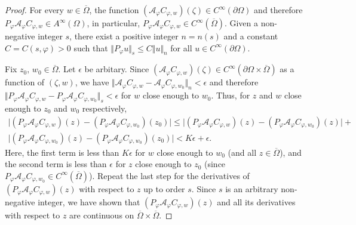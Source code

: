 \documentclass[11pt, reqno]{amsart}
\numberwithin{equation}{section}
\begin{document}
\begin{proof}
\medskip

For every $w\in\overline{\Omega}$, the function $(\mathcal{A}_{\varphi}C_{\varphi,w})(\zeta)\in C^{\infty}(\partial\Omega)$ and therefore $P_{\varphi}\mathcal{A}_{\varphi}C_{\varphi,w}\in A^{\infty}(\Omega)$, in particular, $P_{\varphi}\mathcal{A}_{\varphi}C_{\varphi,w}\in C^{\infty}(\overline{\Omega})$. Given a non-negative integer $s$, there exist a positive integer $n=n(s)$ and a constant $C=C(s,\varphi)>0$ such that $\Vert P_{\varphi}u\Vert_s\leq C \Vert u\Vert_n$ for all $u\in C^{\infty}(\partial\Omega)$.

\medskip

Fix $z_0,\,w_0\in\overline{\Omega}$. Let $\epsilon$ be arbitary. Since $(\mathcal{A}_{\varphi}C_{\varphi,w})(\zeta)\in C^{\infty}(\partial\Omega\times\overline{\Omega})$ as a function of $(\zeta,w)$, we have $\Vert \mathcal{A}_{\varphi}C_{\varphi,w}-\mathcal{A}_{\varphi}C_{\varphi,w_0}\Vert_n<\epsilon$ and therefore $\Vert P_{\varphi}\mathcal{A}_{\varphi}C_{\varphi,w}-P_{\varphi}\mathcal{A}_{\varphi}C_{\varphi,w_0}\Vert_s<\epsilon$ for $w$ close enough to $w_0$. Thus, for $z$ and $w$ close enough to $z_0$ and $w_0$ respectively,
\begin{multline*}
\vert (P_{\varphi}\mathcal{A}_{\varphi} C_{\varphi,w})(z)-(P_{\varphi}\mathcal{A}_{\varphi} C_{\varphi,w_0})(z_0)\vert 
\leq 
\vert (P_{\varphi}\mathcal{A}_{\varphi} C_{\varphi,w})(z) - (P_{\varphi}\mathcal{A}_{\varphi} C_{\varphi,w_0})(z)\vert
+\\
\vert (P_{\varphi}\mathcal{A}_{\varphi} C_{\varphi,w_0})(z)-(P_{\varphi}\mathcal{A}_{\varphi} C_{\varphi,w_0})(z_0)\vert
<
K\epsilon+\epsilon.
\end{multline*}
Here, the first term is less than $K\epsilon$ for $w$ close enough to $w_0$ (and all $z\in\overline{\Omega}$), and the second term is less than $\epsilon$ for $z$ close enough to $z_0$ (since $P_{\varphi}\mathcal{A}_{\varphi}C_{\varphi,w_0}\in C^{\infty}(\overline{\Omega})$). Repeat the last step for the derivatives of $(P_{\varphi}\mathcal{A}_{\varphi} C_{\varphi,w})(z)$ with respect to $z$ up to order $s$. Since $s$ is an arbitrary non-negative integer, we have shown that $(P_{\varphi}\mathcal{A}_{\varphi} C_{\varphi,w})(z)$ and all its derivatives with respect to $z$ are continuous on $\overline{\Omega}\times\overline{\Omega}$. 

\medskip


\end{proof}
\end{document}
